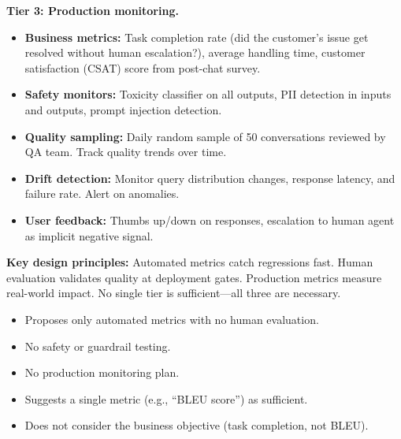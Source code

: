 \begin{interviewq}
\textbf{Tier 3: Production monitoring.}
\begin{itemize}
    \item \textbf{Business metrics:} Task completion rate (did the customer's
          issue get resolved without human escalation?), average handling time,
          customer satisfaction (CSAT) score from post-chat survey.
    \item \textbf{Safety monitors:} Toxicity classifier on all outputs, PII
          detection in inputs and outputs, prompt injection detection.
    \item \textbf{Quality sampling:} Daily random sample of 50 conversations
          reviewed by QA team.  Track quality trends over time.
    \item \textbf{Drift detection:} Monitor query distribution changes, response
          latency, and failure rate.  Alert on anomalies.
    \item \textbf{User feedback:} Thumbs up/down on responses, escalation to
          human agent as implicit negative signal.
\end{itemize}

\textbf{Key design principles:}  Automated metrics catch regressions fast.
Human evaluation validates quality at deployment gates.  Production metrics
measure real-world impact.  No single tier is sufficient---all three are
necessary.

\redflags
\begin{itemize}
    \item Proposes only automated metrics with no human evaluation.
    \item No safety or guardrail testing.
    \item No production monitoring plan.
    \item Suggests a single metric (e.g., ``BLEU score'') as sufficient.
    \item Does not consider the business objective (task completion, not BLEU).
\end{itemize}



\end{interviewq}
